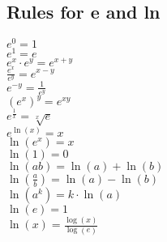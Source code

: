 \documentclass[a4paper,7pt,fleqn]{article}
\begin{document}
\begin{multicols}{3}
\begin{minipage}{\linewidth}
\subsection{Rules for e and ln}
\(e^0 = 1\) \\
\(e^1 = e\) \\
\(e^x \cdot e^y = e^{x+y}\) \\
\(\frac{e^x}{e^y} = e^{x-y}\) \\
\(e^{-y} = \frac{1}{e^y}\) \\
\((e^x)^y = e^{xy}\) \\
\(e^{\frac{1}{x}} = \sqrt[x]{e}\) \\
\(e^{\ln(x)} = x\) \\
\(\ln(e^x) = x\) \\
\(\ln(1) = 0\) \\
\(\ln(ab) = \ln(a) + \ln(b)\) \\
\(\ln\left(\frac{a}{b}\right) = \ln(a) - \ln(b)\) \\
\(\ln(a^k) = k \cdot \ln(a)\) \\
\(\ln(e) = 1\) \\
\(\ln(x) = \frac{\log(x)}{\log(e)}\) \\

\end{minipage}

\end{multicols}
\end{document}
